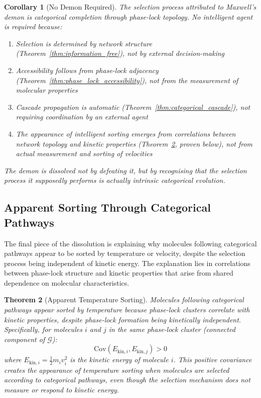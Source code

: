 \documentclass[12pt,a4paper]{article}
\newtheorem{theorem}{Theorem}[section]
\newtheorem{corollary}[theorem]{Corollary}
\theoremstyle{definition}
\theoremstyle{remark}
\newcommand{\phaselockgraph}{\mathcal{G}}
\begin{document}
\begin{corollary}[No Demon Required]
\label{cor:no_demon}
The selection process attributed to Maxwell's demon is categorical completion through phase-lock topology. No intelligent agent is required because:
\begin{enumerate}
    \item Selection is determined by network structure (Theorem~\ref{thm:information_free}), not by external decision-making
    \item Accessibility follows from phase-lock adjacency (Theorem~\ref{thm:phase_lock_accessibility}), not from the measurement of molecular properties
    \item Cascade propagation is automatic (Theorem~\ref{thm:categorical_cascade}), not requiring coordination by an external agent
    \item The appearance of intelligent sorting emerges from correlations between network topology and kinetic properties (Theorem~\ref{thm:apparent_sorting}, proven below), not from actual measurement and sorting of velocities
\end{enumerate}
The demon is dissolved not by defeating it, but by recognising that the selection process it supposedly performs is actually intrinsic categorical evolution.
\end{corollary}

\subsection{Apparent Sorting Through Categorical Pathways}

The final piece of the dissolution is explaining why molecules following categorical pathways appear to be sorted by temperature or velocity, despite the selection process being independent of kinetic energy. The explanation lies in correlations between phase-lock structure and kinetic properties that arise from shared dependence on molecular characteristics.

\begin{theorem}[Apparent Temperature Sorting]
\label{thm:apparent_sorting}
Molecules following categorical pathways appear sorted by temperature because phase-lock clusters correlate with kinetic properties, despite phase-lock formation being kinetically independent. Specifically, for molecules $i$ and $j$ in the same phase-lock cluster (connected component of $\phaselockgraph$):
\begin{equation}
\text{Cov}(E_{\text{kin},i}, E_{\text{kin},j}) > 0
\label{eq:kinetic_correlation}
\end{equation}
where $E_{\text{kin},i} = \frac{1}{2} m_i v_i^2$ is the kinetic energy of molecule $i$. This positive covariance creates the appearance of temperature sorting when molecules are selected according to categorical pathways, even though the selection mechanism does not measure or respond to kinetic energy.
\end{theorem}
\end{document}
